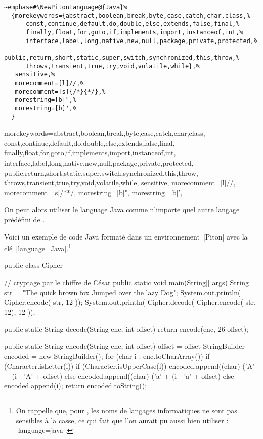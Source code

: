 \documentclass[dvipsnames,svgnames]{article}
\begin{document}
\begin{Verbatim}[formatcom=\small\color{gray}]
~emphase#\NewPitonLanguage@{Java}%
  {morekeywords={abstract,boolean,break,byte,case,catch,char,class,%
      const,continue,default,do,double,else,extends,false,final,%
      finally,float,for,goto,if,implements,import,instanceof,int,%
      interface,label,long,native,new,null,package,private,protected,%
      public,return,short,static,super,switch,synchronized,this,throw,%
      throws,transient,true,try,void,volatile,while},%
   sensitive,%
   morecomment=[l]//,%
   morecomment=[s]{/*}{*/},%
   morestring=[b]",%
   morestring=[b]',%
  }
\end{Verbatim}


  {morekeywords={abstract,boolean,break,byte,case,catch,char,class,
      const,continue,default,do,double,else,extends,false,final,
      finally,float,for,goto,if,implements,import,instanceof,int,
      interface,label,long,native,new,null,package,private,protected,
      public,return,short,static,super,switch,synchronized,this,throw,
      throws,transient,true,try,void,volatile,while},
   sensitive,
   morecomment=[l]//,
   morecomment=[s]{/*}{*/},
   morestring=[b]",
   morestring=[b]',
  }


\medskip
On peut alors utiliser le language Java comme n'importe quel autre langage prédéfini de
.

Voici un exemple de code Java formaté dans un environnement~|{Piton}| avec la
clé~|language=Java|.\footnote{On rappelle que, pour , les noms de langages
  informatiques ne sont pas sensibles à la casse, ce qui fait que l'on aurait pu aussi
  bien utiliser : |language=java|.}

\bigskip
\begingroup
\small
{}
\begin{Piton}[language = Java]
public class Cipher { // cryptage par le chiffre de César
    public static void main(String[] args) {
        String str = "The quick brown fox Jumped over the lazy Dog";
        System.out.println( Cipher.encode( str, 12 ));
        System.out.println( Cipher.decode( Cipher.encode( str, 12), 12 ));
    }

    public static String decode(String enc, int offset) {
        return encode(enc, 26-offset);
    }

    public static String encode(String enc, int offset) {
        offset = offset %
        StringBuilder encoded = new StringBuilder();
        for (char i : enc.toCharArray()) {
            if (Character.isLetter(i)) {
                if (Character.isUpperCase(i)) {
                    encoded.append((char) ('A' + (i - 'A' + offset) %
                } else {
                    encoded.append((char) ('a' + (i - 'a' + offset) %
                }
            } else {
                encoded.append(i);
            }
        }
        return encoded.toString();
    }
}
\end{Piton}
\endgroup
\end{document}
